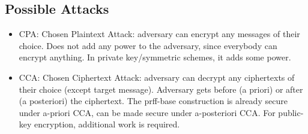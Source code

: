 \subsection{Possible Attacks}

\begin{itemize}
	\item CPA: Chosen Plaintext Attack: adversary can encrypt any messages of their choice.
		Does not add any power to the adversary, since everybody can encrypt anything.
		In private key/symmetric schemes, it adds some power.

	\item CCA: Chosen Ciphertext Attack: adversary can decrypt any ciphertexts of their choice (except target message).
		Adversary gets before (a priori) or after (a posteriori) the ciphertext.
		The prff-base construction is already secure under a-priori CCA, can be made secure under a-posteriori CCA.
		For public-key encryption, additional work is required.
\end{itemize}
